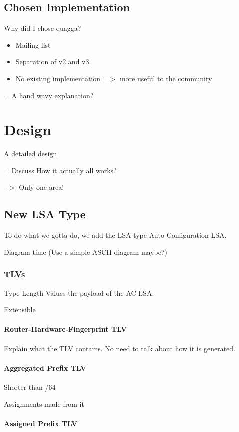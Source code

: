 \documentclass[12pt]{report}
\begin{document}
\section{Chosen Implementation}
Why did I chose quagga?

\begin{itemize}
\item Mailing list
\item Separation of v2 and v3
\item No existing implementation =$>$ more useful to the community
\end{itemize}

= A hand wavy explanation?

\chapter{Design}
A detailed design

= Discuss How it actually all works?

--$>$ Only one area!

\section{New LSA Type}
To do what we gotta do, we add the LSA type Auto Configuration LSA. 

Diagram time (Use a simple ASCII diagram maybe?)

\subsection{TLVs}

Type-Length-Values the payload of the AC LSA. 

Extensible

\subsubsection{Router-Hardware-Fingerprint TLV}

Explain what the TLV contains. No need to talk about how it is generated.

\subsubsection{Aggregated Prefix TLV}

Shorter than /64 

Assignments made from it

\subsubsection{Assigned Prefix TLV}
\end{document}
